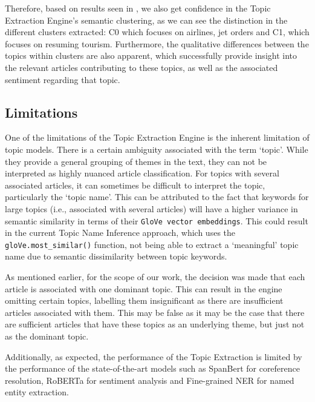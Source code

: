Therefore, based on results seen in , we also get confidence in the Topic Extraction Engine's semantic clustering, as we can see the distinction in the different clusters extracted: C0 which focuses on airlines, jet orders and C1, which focuses on resuming tourism.
Furthermore, the qualitative differences between the topics within clusters are also apparent, which successfully provide insight into the relevant articles contributing to these topics, as well as the associated sentiment regarding that topic.

\subsection{Limitations} \label{limitation_topics}

One of the limitations of the Topic Extraction Engine is the inherent limitation of topic models. There is a certain ambiguity associated with the term `topic'. While they provide a general grouping of themes in the text, they can not be interpreted as highly nuanced article classification. For topics with several associated articles, it can sometimes be difficult to interpret the topic, particularly the `topic name'. This can be attributed to the fact that keywords for large topics (i.e., associated with several articles) will have a higher variance in semantic similarity in terms of their \texttt{GloVe vector embeddings}. This could result in the current Topic Name Inference approach, which uses the \texttt{gloVe.most\_similar()} function, not being able to extract a `meaningful' topic name due to semantic dissimilarity between topic keywords.

As mentioned earlier, for the scope of our work, the decision was made that each article is associated with one dominant topic. This can result in the engine omitting certain topics, labelling them insignificant as there are insufficient articles associated with them. This may be false as it may be the case that there are sufficient articles that have these topics as an underlying theme, but just not as the dominant topic.

Additionally, as expected, the performance of the Topic Extraction is limited by the performance of the state-of-the-art models such as SpanBert for coreference resolution, RoBERTa for sentiment analysis and Fine-grained NER for named entity extraction.  